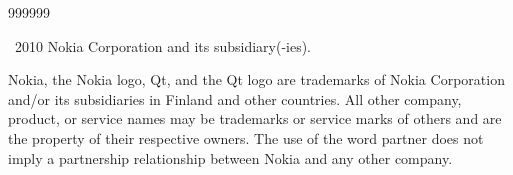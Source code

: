 \begin{slide}{999999}

\vspace{5em}
\textcopyright~2010 Nokia Corporation and its subsidiary(-ies).

\vspace{2em}
{\small Nokia, the Nokia logo, Qt, and the Qt logo are trademarks of Nokia
Corporation and/or its subsidiaries in Finland and other countries.
All other company, product, or service names may be trademarks or service marks
of others and are the property of their respective owners. The use of the word
partner does not imply a partnership relationship between Nokia and any other
company.}

\end{slide}
